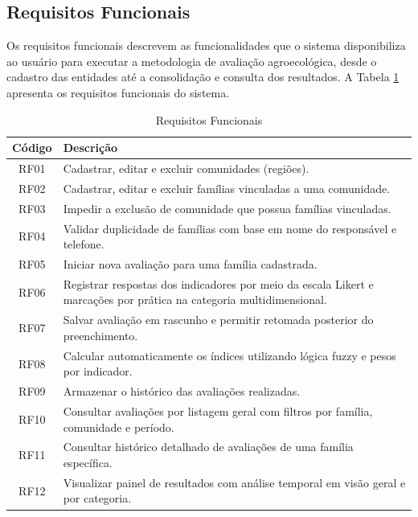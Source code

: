\subsection{Requisitos Funcionais}
\label{subsec:requisitos_funcionais}

Os requisitos funcionais descrevem as funcionalidades que o sistema disponibiliza ao usuário para executar a metodologia de avaliação agroecológica, desde o cadastro das entidades até a consolidação e consulta dos resultados.
A Tabela \ref{tab:requisitos_funcionais} apresenta os requisitos funcionais do sistema.

\begin{table}[h]
    \centering
    \caption{Requisitos Funcionais}
    \label{tab:requisitos_funcionais}
    \begin{tabular}{|c|p{10cm}|}
        \hline
        \textbf{Código} & \textbf{Descrição} \\
        \hline
        RF01 & Cadastrar, editar e excluir comunidades (regiões). \\
        \hline
        RF02 & Cadastrar, editar e excluir famílias vinculadas a uma comunidade. \\
        \hline
        RF03 & Impedir a exclusão de comunidade que possua famílias vinculadas. \\
        \hline
        RF04 & Validar duplicidade de famílias com base em nome do responsável e telefone. \\
        \hline
        RF05 & Iniciar nova avaliação para uma família cadastrada. \\
        \hline
        RF06 & Registrar respostas dos indicadores por meio da escala Likert e marcações por prática na categoria multidimensional. \\
        \hline
        RF07 & Salvar avaliação em rascunho e permitir retomada posterior do preenchimento. \\
        \hline
        RF08 & Calcular automaticamente os índices utilizando lógica fuzzy e pesos por indicador. \\
        \hline
        RF09 & Armazenar o histórico das avaliações realizadas. \\
        \hline
        RF10 & Consultar avaliações por listagem geral com filtros por família, comunidade e período. \\
        \hline
        RF11 & Consultar histórico detalhado de avaliações de uma família específica. \\
        \hline
        RF12 & Visualizar painel de resultados com análise temporal em visão geral e por categoria. \\

\end{tabular}
\end{table}
